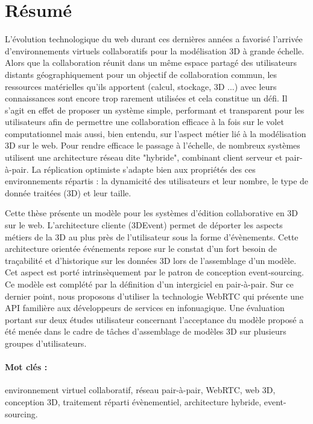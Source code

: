 \clearpage
\section*{Résumé}
\adjustmtc
{}

L’évolution technologique du web durant ces dernières années a favorisé l’arrivée 
d’environnements virtuels collaboratifs pour la modélisation 3D à grande échelle. 
Alors que la collaboration réunit dans un même espace partagé des utilisateurs 
distants géographiquement pour un objectif de collaboration commun, les 
ressources 
matérielles qu'ils apportent (calcul, stockage, 3D ...) avec leurs connaissances 
sont encore trop rarement utilisées et cela constitue un défi. Il s'agit en effet 
de proposer un système simple, performant et transparent pour les utilisateurs 
afin de permettre une collaboration efficace à la fois sur le volet computationnel 
mais aussi, bien entendu, sur l'aspect métier lié à la modélisation 3D sur le web.
Pour rendre efficace le passage à l’échelle, de nombreux systèmes utilisent une 
architecture réseau dite "hybride", combinant client serveur et pair-à-pair. La 
réplication optimiste s'adapte bien aux propriétés des ces environnements répartis 
: la dynamicité des utilisateurs et leur nombre, le type de donnée traitées (3D) 
et leur taille. 

Cette thèse présente un modèle pour les systèmes d’édition collaborative en 3D 
sur le web. L'architecture cliente (3DEvent) permet de déporter les 
aspects métiers de la 3D au plus près de l’utilisateur sous la forme d’évènements. 
Cette architecture orientée événements repose sur le constat 
d’un fort besoin de traçabilité et d’historique sur les données 3D lors de 
l’assemblage d’un modèle. Cet aspect est porté intrinsèquement par le patron de 
conception event-sourcing. Ce modèle est complété par la définition d’un 
intergiciel en pair-à-pair. Sur ce dernier point, nous proposons d'utiliser la 
technologie WebRTC qui présente une API familière aux développeurs de services 
en infonuagique. Une évaluation portant sur deux études utilisateur concernant 
l’acceptance du modèle proposé a été menée dans le cadre de tâches 
d’assemblage de 
modèles 3D sur plusieurs groupes d’utilisateurs.

\paragraph{Mot clés : }environnement virtuel collaboratif, réseau pair-à-pair, WebRTC, web 3D, conception 3D, traitement réparti évènementiel, architecture hybride, event-sourcing.
\pagebreak
